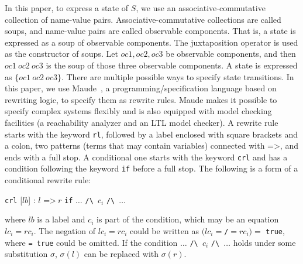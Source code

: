 \documentclass[10pt, conference, compsocconf]{IEEEtran}
\begin{document}

In this paper, to express a state of $S$, we use an
associative-commutative collection of name-value
pairs. Associative-commutative collections are called soups, and
name-value pairs are called observable components. That is, a state is
expressed as a soup of observable components.  The juxtaposition
operator is used as the constructor of soups. Let $oc1, oc2, oc3$ be
observable components, and then $oc1\ oc2\ oc3$ is the soup of those
three observable components. A state is expressed as
$\{oc1\ oc2\ oc3\}$. There are multiple possible ways to specify state
transitions.  In this paper, we use Maude~\cite{Clavel2007LNCS}, a
programming/specification language based on rewriting logic, to
specify them as rewrite rules.  Maude makes it possible to specify
complex systems flexibly and is also equipped with model checking
facilities (a reachability analyzer and an LTL model checker).
A rewrite rule starts with the keyword \verb!rl!, followed by a label enclosed with square brackets and a colon, two patterns (terms that may contain variables) connected with =\textgreater, and ends with a full stop. A conditional one starts with the keyword \verb!crl! and has a condition following the keyword \verb!if! before a full stop.
The following is a form of a conditional rewrite rule:

\smallskip
\noindent
\verb!crl! [$lb$] : $l$ =\textgreater $\ r$ \verb!if! $\ldots$ \verb!/\ !$c_i$ \verb!/\ !$\ldots$
\smallskip

\noindent
where $lb$ is a label and $c_i$ is part of the condition, which may be an equation $lc_i = rc_i$. 
The negation of $lc_i = rc_i$ could be written as $(lc_i =$\verb!/!$= rc_i) =$ \verb!true!, where \verb!= true! could be omitted. 
If the condition
$\ldots$ \verb!/\ !$c_i$ \verb!/\ !$\ldots$ holds under some substitution $\sigma$, $\sigma(l)$ can be replaced with $\sigma(r)$.
\end{document}
